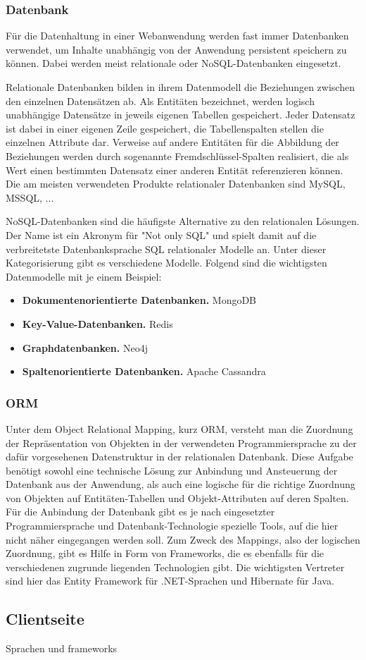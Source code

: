 
\subsubsection{Datenbank}
Für die Datenhaltung in einer Webanwendung werden fast immer Datenbanken verwendet, um Inhalte unabhängig von der Anwendung persistent speichern zu können.
Dabei werden meist relationale oder \acs{NoSQL}-Datenbanken eingesetzt.

Relationale Datenbanken bilden in ihrem Datenmodell die Beziehungen zwischen den einzelnen Datensätzen ab.
Als Entitäten bezeichnet, werden logisch unabhängige Datensätze in jeweils eigenen Tabellen gespeichert. Jeder Datensatz ist dabei in einer eigenen Zeile gespeichert, die Tabellenspalten stellen die einzelnen Attribute dar.
Verweise auf andere Entitäten für die Abbildung der Beziehungen werden durch sogenannte Fremdschlüssel-Spalten realisiert, die als Wert einen bestimmten Datensatz einer anderen Entität referenzieren können.
Die am meisten verwendeten Produkte relationaler Datenbanken sind MySQL, MSSQL, ...%

\acs{NoSQL}-Datenbanken sind die häufigste Alternative zu den relationalen Lösungen. Der Name ist ein Akronym für "Not only SQL" und spielt damit auf die verbreitetste Datenbanksprache \acs{SQL} relationaler Modelle an.
Unter dieser Kategorisierung gibt es verschiedene Modelle. Folgend sind die wichtigsten Datenmodelle mit je einem Beispiel:

\begin{itemize}
\item\textbf{Dokumentenorientierte Datenbanken.} MongoDB
\item\textbf{Key-Value-Datenbanken.} Redis
\item\textbf{Graphdatenbanken.} Neo4j
\item\textbf{Spaltenorientierte Datenbanken.} Apache Cassandra
\end{itemize}

\subsubsection{ORM}
Unter dem Object Relational Mapping, kurz \acs{ORM}, versteht man die Zuordnung der Repräsentation von Objekten in der verwendeten Programmiersprache zu der dafür vorgesehenen Datenstruktur in der relationalen Datenbank.
Diese Aufgabe benötigt sowohl eine technische Lösung zur Anbindung und Ansteuerung der Datenbank aus der Anwendung, als auch eine logische für die richtige Zuordnung von Objekten auf Entitäten-Tabellen und Objekt-Attributen auf deren Spalten.
Für die Anbindung der Datenbank gibt es je nach eingesetzter Programmiersprache und Datenbank-Technologie spezielle Tools, auf die hier nicht näher eingegangen werden soll.
Zum Zweck des Mappings, also der logischen Zuordnung, gibt es Hilfe in Form von Frameworks, die es ebenfalls für die verschiedenen zugrunde liegenden Technologien gibt.
Die wichtigsten Vertreter sind hier das Entity Framework für .NET-Sprachen und Hibernate für Java.

\subsection{Clientseite}
Sprachen und frameworks

